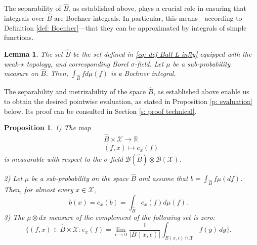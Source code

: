 \documentclass[a4paper, 11pt]{article}
\newtheorem{lem}{Lemma}
\newtheorem{prop}{Proposition}
\theoremstyle{definition}
\newcommand{\R}{{\mathbb{R}}}
\newcommand{\cB}{{\mathcal{B}}}
\newcommand{\cX}{{\mathcal{X}}}
\begin{document}
{The separability of \( \widehat{B} \), as established above, plays a crucial role in ensuring that integrals over \( \widehat{B} \) are Bochner integrals. In particular, this means—according to Definition \ref{def: Bocnher}—that they can be approximated by integrals of simple functions.



\begin{lem}{\label{l: Bochner}}
	The set $\widehat{B}$ be the set defined in \eqref{eq: def Ball L infty}
equipped with the weak-$\star$ topology, and corresponding Borel $\sigma$-field. Let \( \mu \) be a sub-probability measure on \( \widehat{B} \). Then,  \( \int_{\widehat{B}} f  d\mu(f) \) is a Bochner integral.
\end{lem}


The separability and metrizability of the space \( \widehat{B} \), as established
above
enable us to obtain the desired pointwise evaluation, as stated in Proposition \ref{p: evaluation} below. Its proof can be consulted in Section \ref{s: proof technical}.

\begin{prop}{\label{p: evaluation}}
	1) The map 
	\begin{align*}
		&\widehat{B}\times \cX \to \R
		\\
		&(f,x) \mapsto e_x(f)
	\end{align*}
	is measurable with respect to the $\sigma$-field $\cB(\widehat{B}) \otimes \cB(\cX)$.
	
	2) Let $\mu$ be a sub-probability on the space $\widehat{B}$ and assume that $b=\int_{\widehat{B}} f \mu(df)$. Then,
	for almost every $x \in \cX$, 
	\begin{equation}\label{eq : evalutation rigorous}
		b(x) =e_x(b) =\int_{\widehat{B}} e_x(f) d\mu (f). 
	\end{equation}
	3) The $\mu \otimes dx$ measure of the complement of the following set is zero:
	\begin{equation} \label{eq : neg by Fubini}
		\big\{(f,x)\in\widehat{B}\times\cX : e_x(f)  = \lim_{\epsilon \to 0} \frac{1}{|B(x, \epsilon)|} \int_{B(x, \epsilon)\cap\cX} f(y) \, dy\big\}.
	\end{equation}
	
	
\end{prop}


}
\end{document}
